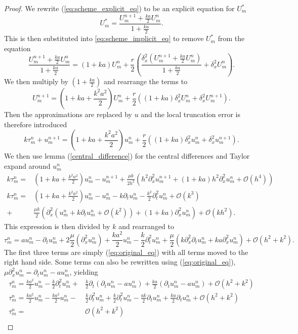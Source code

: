 \begin{proof}
    We rewrite (\ref{eq:scheme_explicit_eq}) to be an explicit equation for $U_m^*$
    $$ U_{m}^{*}= \frac{U_{m}^{n+1}+\frac{ka}{2}U_{m}^{n}}{1+\frac{ka}{2}}.$$
    This is then substituted into \ref{eq:scheme_implicit_eq} to remove $U_{m}^{*}$ from the equation
    $$\frac{U_{m}^{n+1}+\frac{ka}{2}U_{m}^{n}}{1+\frac{ka}{2}} = (1+ka)U_{m}^{n}+\frac{r}{2}\left( \frac{\delta_x^2(U_{m}^{n+1}+\frac{ka}{2}U_{m}^{n})}{1+\frac{ka}{2}}  + \delta_x^2 U_{m}^{n}\right).$$
    We then multiply by $(1+\frac{ka}{2})$ and rearrange the terms to
    $$ U_{m}^{n+1}=(1+ ka + \frac{k^2a^2}{2})U_{m}^{n} + \frac{r}{2}\left((1+ka)\delta_x^2U_{m}^{n} +\delta_x^2U_{m}^{n+1}\right).$$
    Then the approximations are replaced by $u$ and the local truncation error is therefore introduced
    $$ k\tau_m^n + u_{m}^{n+1} = (1+ ka + \frac{k^2a^2}{2})u_{m}^{n} + \frac{r}{2}\left((1+ka)\delta_x^2u_{m}^{n} +\delta_x^2u_{m}^{n+1}\right).$$
    We then use lemma (\ref{central_difference}) for the central differences and Taylor expand around $u_{m}^{n}$
    \begin{align*}
        k \tau_m^n =& \left( 1 + ka +\frac{k^2a^2}{2}\right)u_{m}^{n} - u_{m}^{n+1}+\frac{\mu k}{2h^2} \left(h^2\partial_x^2 u_{m}^{n+1} + \left( 1+ka \right) h^2 \partial_x^2u_{m}^{n} + \mathcal{O}(h^4)\right) \\
        k \tau_m^n =& \left( 1 + ka + \frac{k^2a^2}{2}\right)u_{m}^{n} - u_{m}^{n} - k \partial_tu_{m}^{n} - \frac{k^2}{2} \partial_t^2 u_{m}^{n} + \mathcal{O}(k^3)  \\
        +& \frac{\mu k}{2}\left( \partial_x^2 \left( u_{m}^{n} + k \partial_t u_{m}^{n} + \mathcal{O}(k^2)\right) + \left( 1 + ka\right) \partial_x^2  u_{m}^{n} \right) + \mathcal{O}(kh^2).
    \end{align*}
    This expression is then divided by $k$ and rearranged to 
    $$\tau_m^n = a u_{m}^{n} - \partial_tu_{m}^{n} + 2 \frac{\mu}{2}\left( \partial_x^2 u_{m}^{n}\right) +  \frac{ka^2}{2}u_{m}^{n}  - \frac{k}{2} \partial_t^2 u_{m}^{n} + \frac{\mu }{2}\left( k \partial_x^2 \partial_t u_{m}^{n}  + ka \partial_x^2  u_{m}^{n} \right) + \mathcal{O}(h^2 + k^2).$$
    The first three terms are simply (\ref{eq:original_eq}) with all terms moved to the right hand side. Some terms can also be rewritten using (\ref{eq:original_eq}), $\mu \partial_x^2u_{m}^{n} = \partial_t u_{m}^{n} - au_{m}^{n}$, yielding
    \begin{align*}
        \tau_m^n = \frac{ka^2}{2}u_{m}^{n}  - \frac{k}{2} \partial_t^2 u_{m}^{n} +& \frac{k}{2} \partial_t \left(\partial_t u_{m}^{n}   - au_{m}^{n} \right) + \frac{ka}{2} \left( \partial_t  u_{m}^{n} - a u_{m}^{n}\right)+ \mathcal{O}(h^2 + k^2) \\
        \tau_m^n = \frac{ka^2}{2}u_{m}^{n} - \frac{ka^2}{2}u_{m}^{n}  -& \frac{k}{2} \partial_t^2 u_{m}^{n} + \frac{k}{2} \partial_t^2 u_{m}^{n} - \frac{ak}{2} \partial_t u_{m}^{n} + \frac{ka}{2} \partial_t  u_{m}^{n}+ \mathcal{O}(h^2 + k^2) \\
        \tau_m^n =& \mathcal{O}(h^2 + k^2) \\
    \end{align*}
\end{proof}

